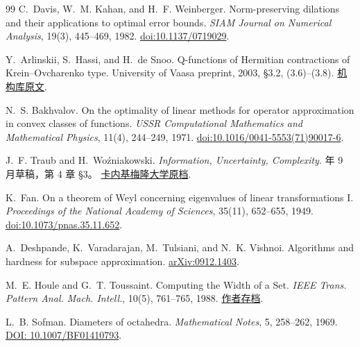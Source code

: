\documentclass[UTF8,11pt,fontset=windows]{ctexart}
\begin{document}
{\small
\begin{thebibliography}{99}
C.~Davis, W.~M. Kahan, and H.~F. Weinberger.
\newblock Norm-preserving dilations and their applications to optimal error bounds.
\newblock \emph{SIAM Journal on Numerical Analysis}, 19(3), 445--469, 1982.
\newblock \href{https://doi.org/10.1137/0719029}{doi:10.1137/0719029}.

Y.~Arlinskii, S.~Hassi, and H.~de Snoo.
\newblock Q-functions of Hermitian contractions of Krein--Ovcharenko type.
\newblock University of Vaasa preprint, 2003, \S3.2, (3.6)--(3.8).
\newblock \href{https://osuva.uwasa.fi/server/api/core/bitstreams/a4d9c302-1a66-49d6-bbdc-987489c4ecd5/content}{机构库原文}.

N.~S. Bakhvalov.
\newblock On the optimality of linear methods for operator approximation in convex classes of functions.
\newblock \emph{USSR Computational Mathematics and Mathematical Physics}, 11(4), 244--249, 1971.
\newblock \href{https://doi.org/10.1016/0041-5553(71)90017-6}{doi:10.1016/0041-5553(71)90017-6}.

J.~F. Traub and H.~Wo\'zniakowski.
\newblock \emph{Information, Uncertainty, Complexity}.
 年 9 月草稿，第 4 章 \S3。
\newblock \href{https://iiif.library.cmu.edu/file/Traub_box00013_fld00023_bdl0003_doc0001/Traub_box00013_fld00023_bdl0003_doc0001.pdf}{卡内基梅隆大学原档}.

K.~Fan.
\newblock On a theorem of Weyl concerning eigenvalues of linear transformations I.
\newblock \emph{Proceedings of the National Academy of Sciences}, 35(11), 652--655, 1949.
\newblock \href{https://doi.org/10.1073/pnas.35.11.652}{doi:10.1073/pnas.35.11.652}.

A.~Deshpande, K.~Varadarajan, M.~Tulsiani, and N.~K. Vishnoi.
\newblock Algorithms and hardness for subspace approximation.
\newblock \href{https://arxiv.org/abs/0912.1403}{arXiv:0912.1403}.

M.~E. Houle and G.~T. Toussaint.
\newblock Computing the Width of a Set.
\newblock \emph{IEEE Trans. Pattern Anal. Mach. Intell.}, 10(5), 761--765, 1988.
\newblock \href{https://cgm.cs.mcgill.ca/~godfried/publications/width.pdf}{作者存档}.

L.~B. Sofman.
\newblock Diameters of octahedra.
\newblock \emph{Mathematical Notes}, 5, 258--262, 1969.
\newblock \href{https://doi.org/10.1007/BF01410793}{DOI: 10.1007/BF01410793}.


\end{thebibliography}}
\end{document}
